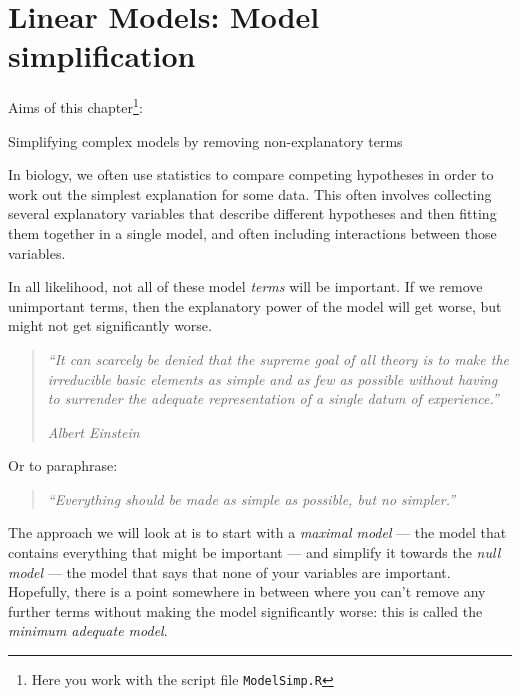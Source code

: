 \chapter{Linear Models: Model simplification}
\label{chap:ModelSimp}

Aims of this chapter\footnote{Here you work with the script file {\tt ModelSimp.R}}:
\begin{compactitem}
	\item Simplifying complex models by removing non-explanatory terms
\end{compactitem}

In biology, we often use statistics to compare competing hypotheses in 
order to work out the simplest explanation for some data. This often 
involves collecting several explanatory variables that describe 
different hypotheses and then fitting them together in a single model, 
and often including interactions between those variables.

In all likelihood, not all of these model {\it terms} will be 
important. If we remove unimportant terms, then the explanatory power 
of the model will get worse, but might not get significantly worse. 

\begin{quotation} \it
``It can scarcely be denied that the supreme goal of all theory is to 
make the irreducible basic elements as simple and as few as possible 
without having to surrender the adequate representation of a single 
datum of experience.'' 

\em Albert Einstein

\end{quotation}

\noindent Or to paraphrase:

\begin{quotation}\it
``Everything should be made as simple as possible, but no simpler.''
\end{quotation}

The approach we will look at is to start with a {\it maximal model} 
--- the model that contains everything that might be important --- and 
simplify it towards the {\it null model} --- the model that says that 
none of your variables are important. Hopefully, there is a point 
somewhere in between where you can't remove any further terms without 
making the model significantly worse: this is called the {\it minimum 
adequate model}.


